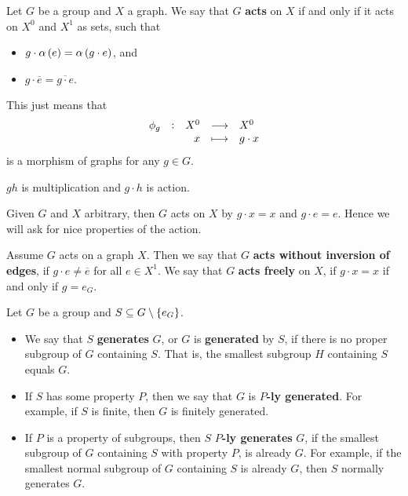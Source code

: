 \begin{definition}
Let $ G $ be a group and $ X $ a graph. We say that $ G $ \textbf{acts} on $ X $ if and only if it acts on $ X^0 $ and $ X^1 $ as sets, such that
\begin{itemize}
\item $ g \cdot \alpha\br{e} = \alpha\br{g \cdot e} $, and
\item $ g \cdot \overline{e} = \overline{g \cdot e} $.
\end{itemize}
\end{definition}

\begin{note*}
This just means that
$$ \function[\phi_g]{X^0}{X^0}{x}{g \cdot x} $$
is a morphism of graphs for any $ g \in G $.
\end{note*}

\begin{notation*}
$ gh $ is multiplication and $ g \cdot h $ is action.
\end{notation*}

\begin{remark*}
Given $ G $ and $ X $ arbitrary, then $ G $ acts on $ X $ by $ g \cdot x = x $ and $ g \cdot e = e $. Hence we will ask for nice properties of the action.
\end{remark*}

\begin{definition}
Assume $ G $ acts on a graph $ X $. Then we say that $ G $ \textbf{acts without inversion of edges}, if $ g \cdot e \ne \overline{e} $ for all $ e \in X^1 $. We say that $ G $ \textbf{acts freely} on $ X $, if $ g \cdot x = x $ if and only if $ g = e_G $.
\end{definition}

\begin{definition}
Let $ G $ be a group and $ S \subseteq G \setminus \cbr{e_G} $.
\begin{itemize}
\item We say that $ S $ \textbf{generates} $ G $, or $ G $ is \textbf{generated} by $ S $, if there is no proper subgroup of $ G $ containing $ S $. That is, the smallest subgroup $ H $ containing $ S $ equals $ G $.
\item If $ S $ has some property $ P $, then we say that $ G $ is \textbf{$ P $-ly generated}. For example, if $ S $ is finite, then $ G $ is finitely generated.
\item If $ P $ is a property of subgroups, then $ S $ \textbf{$ P $-ly generates} $ G $, if the smallest subgroup of $ G $ containing $ S $ with property $ P $, is already $ G $. For example, if the smallest normal subgroup of $ G $ containing $ S $ is already $ G $, then $ S $ normally generates $ G $.
\end{itemize}
\end{definition}


